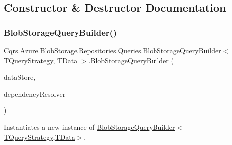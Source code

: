 \subsection{Constructor \& Destructor Documentation}
\mbox{\label{classCqrs_1_1Azure_1_1BlobStorage_1_1Repositories_1_1Queries_1_1BlobStorageQueryBuilder_ae6519f289d2b7be9d322dfa7171dea8b_ae6519f289d2b7be9d322dfa7171dea8b}} 
\subsubsection{\texorpdfstring{Blob\+Storage\+Query\+Builder()}{BlobStorageQueryBuilder()}}
{\footnotesize\ttfamily \hyperlink{classCqrs_1_1Azure_1_1BlobStorage_1_1Repositories_1_1Queries_1_1BlobStorageQueryBuilder}{Cqrs.\+Azure.\+Blob\+Storage.\+Repositories.\+Queries.\+Blob\+Storage\+Query\+Builder}$<$ T\+Query\+Strategy, T\+Data $>$.\hyperlink{classCqrs_1_1Azure_1_1BlobStorage_1_1Repositories_1_1Queries_1_1BlobStorageQueryBuilder}{Blob\+Storage\+Query\+Builder} (\begin{DoxyParamCaption}\item[{\hyperlink{interfaceCqrs_1_1DataStores_1_1IDataStore}{I\+Data\+Store}$<$ T\+Data $>$}]{data\+Store,  }\item[{\hyperlink{interfaceCqrs_1_1Configuration_1_1IDependencyResolver}{I\+Dependency\+Resolver}}]{dependency\+Resolver }\end{DoxyParamCaption})\hspace{0.3cm}{\ttfamily [protected]}}



Instantiates a new instance of \hyperlink{classCqrs_1_1Azure_1_1BlobStorage_1_1Repositories_1_1Queries_1_1BlobStorageQueryBuilder_ae6519f289d2b7be9d322dfa7171dea8b_ae6519f289d2b7be9d322dfa7171dea8b}{Blob\+Storage\+Query\+Builder$<$\+T\+Query\+Strategy,\+T\+Data$>$}. 



